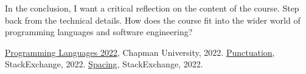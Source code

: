 \documentclass{article}
\theoremstyle{theorem}
\theoremstyle{definition}
\theoremstyle{remark}
\begin{document}
In the conclusion, I want a critical reflection on the content of the course. Step back from the technical details. How does the course fit into the wider world of programming languages and software engineering?

\begin{thebibliography}{99}
 \href{https://github.com/alexhkurz/programming-languages-2022/blob/main/README.md}{Programming Languages 2022}, Chapman University, 2022.
 \href{https://tex.stackexchange.com/questions/2369/why-do-the-less-than-symbol-and-the-greater-than-symbol-appear-wrong-as}{Punctuation}, StackExchange, 2022.
 \href{https://tex.stackexchange.com/questions/14526/spaces-behind-textgreater-not-working-as-expected}{Spacing}, StackExchange, 2022.
\end{thebibliography}
\end{document}
